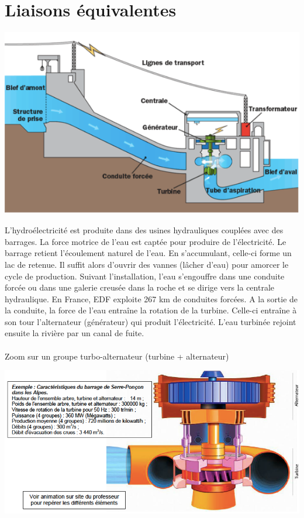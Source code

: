 
\section{Liaisons équivalentes}


\begin{center}
    \includegraphics[scale=0.5]{png/1_exo4.png}
\end{center}

L'hydro\'electricit\'e est produite dans des usines hydrauliques coupl\'ees avec des barrages. La force motrice de l'eau est capt\'ee pour produire de l'\'electricit\'e.
Le barrage retient l'\'ecoulement naturel de l'eau. En s'accumulant, celle-ci forme un lac de retenue. Il suffit alors d'ouvrir des vannes (l\^acher d'eau) pour amorcer le cycle de production. Suivant l'installation, l'eau s'engouffre dans une conduite forc\'ee ou dans une galerie creus\'ee dans la roche et se dirige vers la centrale hydraulique.
En France, EDF exploite 267 km de conduites forc\'ees. A la sortie de la conduite, la force de l'eau entra\^ine la rotation de la turbine. Celle-ci entra\^ine \`a son tour l'alternateur (g\'en\'erateur) qui produit l'\'electricit\'e. L'eau turbin\'ee rejoint ensuite la rivi\`ere par un canal de fuite.\\
\\
Zoom sur un groupe turbo-alternateur (turbine + alternateur)

\begin{center}
    \includegraphics[scale=0.5]{png/2_exo4.png}
\end{center}

